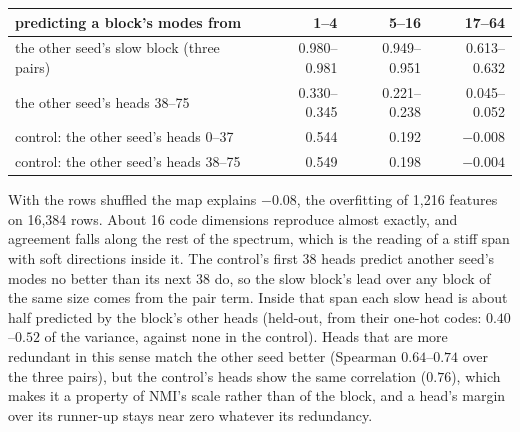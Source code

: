 \begin{center}\small\setlength{\tabcolsep}{4pt}
\begin{tabular}{@{}lrrr@{}}
\toprule
predicting a block's modes from & 1--4 & 5--16 & 17--64 \\
\midrule
the other seed's slow block (three pairs) & 0.980--0.981 & 0.949--0.951 & 0.613--0.632 \\
the other seed's heads 38--75 & 0.330--0.345 & 0.221--0.238 & 0.045--0.052 \\
control: the other seed's heads 0--37 & 0.544 & 0.192 & $-0.008$ \\
control: the other seed's heads 38--75 & 0.549 & 0.198 & $-0.004$ \\
\bottomrule
\end{tabular}
\end{center}

\noindent With the rows shuffled the map explains $-0.08$, the
overfitting of 1{,}216 features on 16{,}384 rows. About 16 code dimensions
reproduce almost exactly, and agreement falls along the rest of the
spectrum, which is the reading of a stiff span with soft directions inside
it. The control's first 38 heads predict another seed's modes no better
than its next 38 do, so the slow block's lead over any block of the same
size comes from the pair term. Inside that span each slow head is about
half predicted by the block's other heads (held-out, from their one-hot
codes: $0.40$--$0.52$ of the variance, against none in the control). Heads
that are more redundant in this sense match the other seed better
(Spearman $0.64$--$0.74$ over the three pairs), but the control's heads
show the same correlation ($0.76$), which makes it a property of NMI's
scale rather than of the block, and a head's margin over its runner-up
stays near zero whatever its redundancy.

